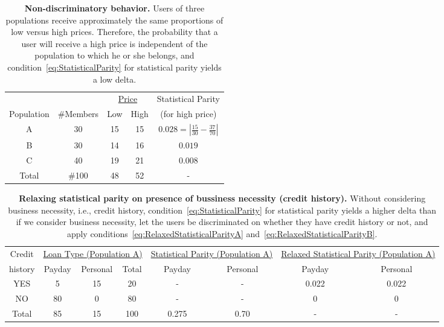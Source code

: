 \begin{table}[t]
{\scriptsize
  \renewcommand{\arraystretch}{1.5}
  \begin{tabular}{ c | c | c  c | c }
    & & \multicolumn{2}{|c|}{\underline{Price}} &  Statistical Parity\\
    Population & \#Members & Low & High & (for high price) \\
    \hline
    A & 30 &  15 & 15 & $0.028 = | \frac{15}{30} - \frac{37}{70}|$ \\
    B & 30 &  14 & 16 & $0.019$ \\
    C & 40 &  19 & 21 & $0.008$ \\
    \hline
    Total & \#100 & 48 & 52 & - \\
  \end{tabular}
  \caption{{\bf Non-discriminatory behavior.} Users of three populations receive approximately
  the same proportions of low versus high prices. Therefore, the probability that a user
  will receive a high price is independent of the population to which he or she belongs,
  and condition~\ref{eq:StatisticalParity} for statistical parity yields a low delta.}
  \label{tab:NonDiscriminationExample}
}
\end{table}




\begin{table*}[t]
{ \small
  \center
  \renewcommand{\arraystretch}{1.5}
  \begin{tabular}{ c | c c c | c c | c c}
    Credit
    & \multicolumn{3}{|c|}{\underline{Loan Type (Population A)}}
    & \multicolumn{2}{|c}{\underline{Statistical Parity (Population A) }}
    & \multicolumn{2}{|c}{\underline{Relaxed Statistical Parity (Population A) }} \\
    history & Payday & Personal & Total & Payday & Personal & Payday & Personal \\
    \hline
    YES & 5  & 15 & 20 & - & - &  0.022 & 0.022 \\
    NO  & 80 & 0  & 80 & - & - &  0    & 0 \\
    \hline
    Total & 85 & 15 & 100 & 0.275 & 0.70 & - & - \\
  \end{tabular}
  \label{tab:BusinessNessecityA}
  \caption{{\bf Relaxing statistical parity on presence of bussiness necessity (credit history).}
    Without considering business necessity, i.e., credit history,
    condition~\ref{eq:StatisticalParity} for statistical parity yields a higher delta than if we
    consider business necessity, let the users be discriminated on whether they have credit
    history or not, and apply conditions~\ref{eq:RelaxedStatisticalParityA}
    and~\ref{eq:RelaxedStatisticalParityB}.}
} \end{table*}



